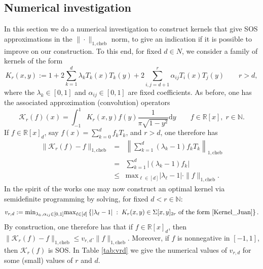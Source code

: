 \documentclass[11pt]{article}
\newcommand{\N}{\mathbb{N}}
\newcommand{\R}{\mathbb{R}}
\renewcommand{\min}{\mathrm{min}}
\renewcommand{\max}{\mathrm{max}}
\theoremstyle{definition}
\newcommand{\cheb}{{1,\mathrm{cheb}}}
\begin{document}
\subsection{Numerical investigation}
In this section we do a numerical investigation to construct kernels that give SOS approximations in the $\|\cdot\|_\cheb$ norm, to give an indication
if it is possible to improve on our construction.
To this end, for fixed $d \in N$, we consider a family of kernels of the form
\begin{equation}\label{Kernel_Juan}
  K_r(x,y) := 1 + 2\sum_{k=1}^d \lambda_k T_k(x)T_k(y)  + 2\sum_{i,j = d+1}^r  \alpha_{ij} T_i(x)T_j(y)\quad \quad r > d,
\end{equation}
where the $\lambda_k \in [0,1]$ and $\alpha_{ij} \in [0,1]$ are fixed coefficients. As before, one has the associated approximation (convolution) operators
\[
\mathcal{K}_r(f)(x) = \int_{-1}^1 K_r(x,y) f(y) \frac{1}{\pi \sqrt{1-y^2}}\mathrm{d}y \quad \quad f \in \R[x], \; r \in \N.
\]
If $f \in \R[x]_d$, say $f(x) = \sum_{k=0}^d f_kT_k$, and $r > d$, one therefore has
\begin{eqnarray*}
  \|\mathcal{K}_r(f) - f\|_\cheb &=&  \left\|\sum_{k=1}^d (\lambda_k -1)f_kT_k\right\|_\cheb \\
   &=& \sum_{k=1}^d |(\lambda_k - 1)f_k| \\
   &\le &\max_{\ell \in [d]} |\lambda_\ell - 1|\cdot \|f\|_\cheb.
\end{eqnarray*}
In the spirit of the works \cite{doi:10.1137/22M1494476,De_Klerk_Vera_2024} one may now construct an optimal kernel via semidefinite programming
by solving, for fixed $d < r \in \N$:
\begin{equation}\label{def:v_rd}
  v_{r,d} := \min_{\lambda_k, \alpha_{ij} \in [0,1]} \max_{\ell \in [d]}\left\{|\lambda_\ell - 1| \; : \; K_r(x,y) \in \Sigma[x,y]_{2r} \mbox{ of the form } \eqref{Kernel_Juan}\right\}.
\end{equation}
By construction, one therefore has that if $f \in \R[x]_d$, then $\|\mathcal{K}_r(f) - f\|_\cheb \le v_{r,d}\cdot \|f\|_\cheb$. Moreover,
if $f$ is nonnegative in $[-1,1]$, then $\mathcal{K}_r(f)$ is SOS.
In Table \ref{tab:vrd} we give the numerical values of $v_{r,d}$ for some (small) values of $r$ and $d$.
\end{document}
